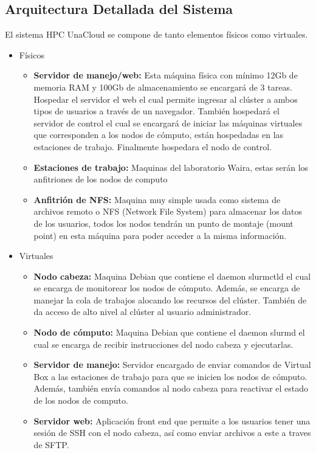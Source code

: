 \subsection{Arquitectura Detallada del Sistema}
El sistema HPC UnaCloud se compone de tanto elementos físicos como virtuales.
\begin{itemize}
    \item Físicos
    \begin{itemize}
        \item \textbf{Servidor de manejo/web:} Esta máquina física con mínimo 12Gb de memoria RAM y 100Gb de almacenamiento se encargará de 3 tareas. Hospedar el servidor el web el cual permite ingresar al clúster a ambos tipos de usuarios a través de un navegador. También hospedará el servidor de control el cual se encargará de iniciar las máquinas virtuales que corresponden a los nodos de cómputo, están hospedadas en las estaciones de trabajo. Finalmente hospedara el nodo de control.
        \item \textbf{Estaciones de trabajo:} Maquinas del laboratorio Waira, estas serán los anfitriones de los nodos de computo
        \item \textbf{Anfitrión de NFS:} Maquina muy simple usada como sistema de archivos remoto o NFS (Network File System) para almacenar los datos de los usuarios, todos los nodos tendrán un punto de montaje (mount point) en esta máquina para poder acceder a la misma información.
    \end{itemize}
    \item Virtuales
    \begin{itemize}
        \item \textbf{Nodo cabeza:} Maquina Debian que contiene el daemon slurmctld el cual se encarga de monitorear los nodos de cómputo. Además, se encarga de manejar la cola de trabajos alocando los recursos del clúster. También de da acceso de alto nivel al clúster al usuario administrador.
        \item \textbf{Nodo de cómputo:} Maquina Debian que contiene el daemon slurmd el cual se encarga de recibir instrucciones del nodo cabeza y ejecutarlas.
        \item \textbf{Servidor de manejo:} Servidor encargado de enviar comandos de Virtual Box a las estaciones de trabajo para que se inicien los nodos de cómputo. Además, también envía comandos al nodo cabeza para reactivar el estado de los nodos de
        computo.
        \item \textbf{Servidor web:} Aplicación front end que permite a los usuarios tener una sesión de SSH con el nodo cabeza, así como enviar archivos a este a traves de SFTP.
    \end{itemize}
\end{itemize}

